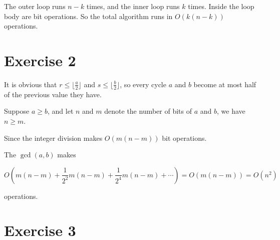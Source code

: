 \documentclass[
]{article}
\newenvironment{Shaded}{\begin{snugshade}}{\end{snugshade}}
\newcommand{\CommentTok}[1]{\textcolor[rgb]{0.56,0.35,0.01}{\textit{#1}}}
\newcommand{\ControlFlowTok}[1]{\textcolor[rgb]{0.13,0.29,0.53}{\textbf{#1}}}
\newcommand{\DecValTok}[1]{\textcolor[rgb]{0.00,0.00,0.81}{#1}}
\newcommand{\KeywordTok}[1]{\textcolor[rgb]{0.13,0.29,0.53}{\textbf{#1}}}
\newcommand{\NormalTok}[1]{#1}
\newcommand{\OperatorTok}[1]{\textcolor[rgb]{0.81,0.36,0.00}{\textbf{#1}}}
\begin{document}
The outer loop runs \(n-k\) times, and the inner loop runs \(k\) times.
Inside the loop body are bit operations. So the total algorithm runs in
\(O(k(n−k))\) operations.

\hypertarget{exercise-2}{%
\section{Exercise 2}\label{exercise-2}}

\begin{Shaded}
\end{Shaded}

It is obvious that \(r\le\lfloor\frac{a}{2}\rfloor\) and
\(s\le\lfloor\frac{b}{2}\rfloor\), so every cycle \(a\) and \(b\) become
at most half of the previous value they have.

Suppose \(a\ge b\), and let \(n\) and \(m\) denote the number of bits of
\(a\) and \(b\), we have \(n\ge m\).

Since the integer division makes \(O(m(n-m))\) bit operations.

The \(\gcd(a,b)\) makes

\[O(m(n-m)+\frac{1}{2^2}m(n-m)+\frac{1}{2^4}m(n-m)+\cdots)=O(m(n-m))=O(n^2)\]

operations.

\hypertarget{exercise-3}{%
\section{Exercise 3}\label{exercise-3}}
\end{document}
